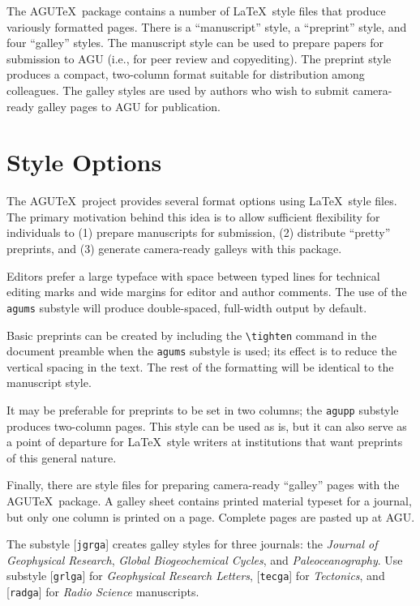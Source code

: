 The AGU\TeX\ package contains a number of \LaTeX\ style files 
that pro\-duce variously formatted pages.  There is a ``manuscript'' 
style, a ``preprint'' style, and four ``galley'' styles.  The 
manuscript style can be used to prepare papers for submission to 
AGU (i.e., for peer review and copyediting).  The preprint style 
produces a compact, two-column format suitable for distribution 
among colleagues.  The galley styles are used by authors who wish
to submit camera-ready galley pages to AGU for publication.

\section{Style Options}

The AGU\TeX\ project provides several format options using \LaTeX\ 
style files.  The primary motivation behind this idea is to allow 
sufficient flexibility for individuals to (1) prepare manuscripts
for submission, (2) distribute ``pretty'' preprints, and (3) generate 
camera-ready galleys with this package.

Editors prefer a large typeface with space between typed lines 
for technical editing marks and wide margins for editor and author 
comments.  The use of the {\tt agums} substyle will produce 
double-spaced, full-width output by default.  

Basic preprints can be created by including the \verb"\tighten" 
command in the document preamble when the {\tt agums} substyle is 
used; its effect is to reduce the vertical spacing in the text. The 
rest of the formatting will be identical to the manuscript style.

It may be preferable for preprints to be set in two columns; the 
{\tt agupp} substyle produces two-column pages.  This style can 
be used as is, but it can also serve as a point of departure for
\LaTeX\ style writers at institutions that want preprints of this 
general nature.

Finally, there are style files for preparing camera-ready ``galley''
pages with the AGU\TeX\ package.  A galley sheet contains printed
material typeset for a journal, but only one column is printed 
on a page.  Complete pages are pasted up at AGU.  

The substyle [{\tt jgrga}] creates galley styles for three journals:  
the {\it Journal of Geophysical Research}, {\it Global Biogeochemical 
Cycles}, and {\it Paleoceanography}.  Use substyle [{\tt grlga}] for 
{\it Geophysical Research Letters}, [{\tt tecga}] for {\it Tectonics}, 
and [{\tt radga}] for {\it Radio Science} manuscripts.

